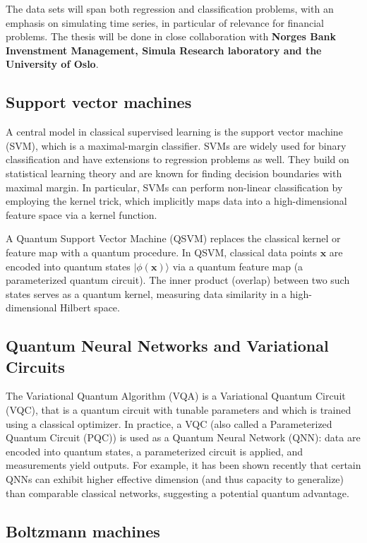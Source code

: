 \documentclass[%
oneside,                 %
final,                   %
10pt]{article}
\begin{document}
\noindent
The data sets will span both regression and classification problems,
with an emphasis on simulating time series, in particular  of relevance for financial
problems. The thesis will be done in close collaboration with \textbf{Norges
Bank Invenstment Management, Simula Research laboratory and the
University of Oslo}.

\subsection*{Support vector machines}

A central model in classical
supervised learning is the support vector machine (SVM), which is a
maximal-margin classifier.  SVMs are widely used for binary classification
and have extensions to regression problems as well.
They build on statistical learning
theory and are known for finding decision boundaries with maximal
margin.  In particular, SVMs can perform non-linear classification by
employing the kernel trick, which implicitly maps data into a
high-dimensional feature space via a kernel function.

A Quantum Support Vector Machine (QSVM) replaces the classical kernel
or feature map with a quantum procedure.  In QSVM, classical data
points $\bm{x}$ are encoded into quantum states
$|\phi(\bm{x})\rangle$ via a quantum feature map (a parameterized
quantum circuit).  The inner product (overlap) between two such states
serves as a quantum kernel, measuring data similarity in a
high-dimensional Hilbert space.

\subsection*{Quantum Neural Networks and Variational Circuits}

The Variational Quantum Algorithm (VQA) is a 
Variational Quantum Circuit (VQC), that is  a quantum circuit with tunable
parameters and which is trained using a classical optimizer.  In practice, a
VQC (also called a Parameterized Quantum Circuit (PQC)) is used as a
Quantum Neural Network (QNN): data are encoded into quantum states, a
parameterized circuit is applied, and measurements yield outputs.
For example, it has been shown recently that certain QNNs can exhibit higher
effective dimension (and thus capacity to generalize) than comparable
classical networks, suggesting a potential quantum advantage.

\subsection*{Boltzmann machines}
\end{document}
